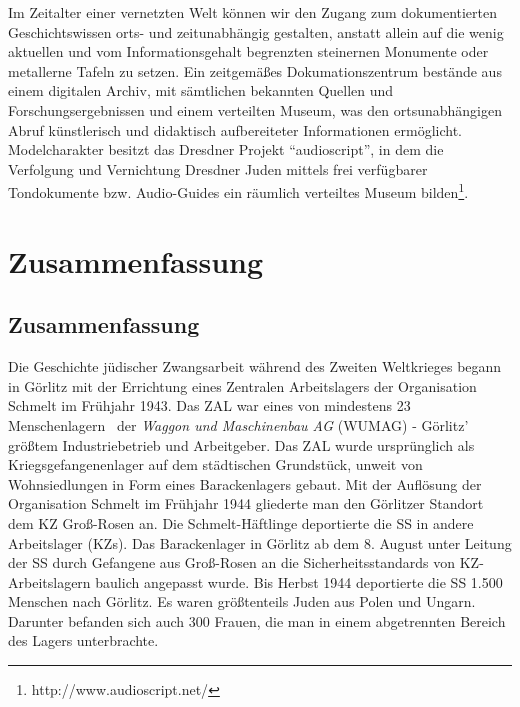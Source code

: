 \documentclass[a4paper,12pt,ngerman,
]{nisebook}
\begin{document}
Im Zeitalter einer vernetzten Welt können wir den Zugang zum dokumentierten
Geschichts\-wissen orts- und zeitunabhängig gestalten, anstatt allein
auf die wenig aktuellen und vom Informationsgehalt begrenzten steinernen
Monumente oder metallerne Tafeln zu setzen. Ein zeitgemäßes Dokumationszentrum
bestände aus einem digitalen Archiv, mit sämtlichen bekannten Quellen
und Forschungsergebnissen und einem verteilten Museum, was den ortsunabhängigen
Abruf künstlerisch und didaktisch aufbereiteter Informationen ermöglicht.
Modelcharakter besitzt das Dresdner Projekt {}``audioscript'',
in dem die Verfolgung und Vernichtung Dresdner Juden mittels frei
verfügbarer Tondokumente bzw. Audio-Guides ein räumlich verteiltes
Museum bilden\footnote{http://www.audioscript.net/}. 




 
\chapter{Zusammenfassung}
\section{Zusammenfassung}
Die Geschichte jüdischer Zwangsarbeit während des Zweiten Weltkrieges begann in Görlitz mit der Errichtung eines Zentralen Arbeitslagers der Organisation Schmelt im Frühjahr 1943. Das ZAL war eines von mindestens 23 \glqq Menschenlagern\grqq~ der \emph{Waggon und Maschinenbau AG} (WUMAG) - Görlitz' größtem Industriebetrieb und Arbeitgeber. Das ZAL wurde ursprünglich als Kriegsgefangenenlager auf dem städtischen Grundstück, unweit von Wohnsiedlungen in Form eines Barackenlagers gebaut. Mit der Auflösung der Organisation Schmelt im Frühjahr 1944 gliederte man den Görlitzer Standort dem KZ Groß-Rosen an. Die Schmelt-Häftlinge deportierte die SS in andere Arbeitslager (KZs). Das Barackenlager in Görlitz ab dem 8. August unter Leitung der SS durch Gefangene aus Groß-Rosen an die Sicherheitsstandards von KZ-Arbeitslagern baulich angepasst wurde. Bis Herbst 1944 deportierte die SS 1.500 Menschen nach Görlitz. Es waren größtenteils Juden aus Polen und Ungarn. Darunter befanden sich auch 300 Frauen, die man in einem abgetrennten Bereich des Lagers unterbrachte. 
\end{document}
